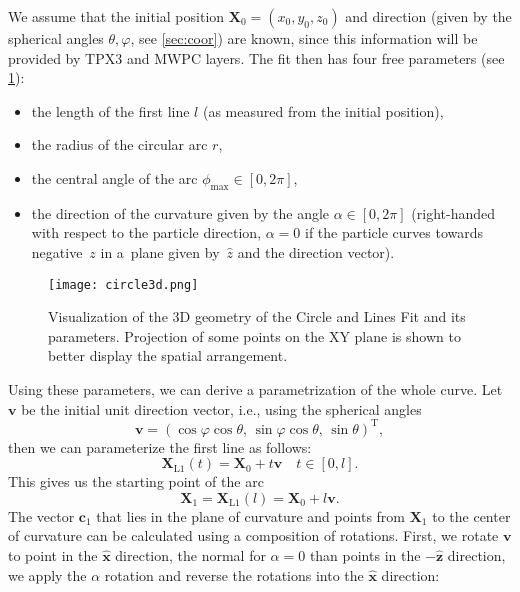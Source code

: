 			We assume that the initial position $\mathbf{X}_0 = (x_0,y_0,z_0)$ and direction (given by the spherical angles $\theta,\varphi$, see \cref{sec:coor}) are known, since this information will be provided by \ac{TPX3} and \ac{MWPC} layers. The fit then has four free parameters (see \cref{fig:circle3d}):
				\begin{itemize}[nosep]
					\item the length of the first line $l$ (as measured from the initial position),
					\item the radius of the circular arc $r$,
					\item the central angle of the arc $\phi_\text{max} \in [0,2\pi]$,
					\item the direction of the curvature given by the angle $\alpha \in [0,2\pi]$ (right-handed with respect to the particle direction, $\alpha = 0$ if the particle curves towards negative~$z$ in a~plane given by~$\hat{z}$ and the direction vector).
				\end{itemize}
			\begin{figure}
				\centering
				\texttt{[image: circle3d.png]}
				\caption{Visualization of the 3D geometry of the Circle and Lines Fit and its parameters. Projection of some points on the XY plane is shown to better display the spatial arrangement.}
				\label{fig:circle3d}
			\end{figure}
			Using these parameters, we can derive a parametrization of the whole curve. Let $\mathbf{v}$ be the initial unit direction vector, i.e., using the spherical angles
				\begin{equation}
					\mathbf{v} = (\cos\varphi\cos\theta, \,\sin\varphi\cos\theta, \,\sin\theta)^\mathrm{T},
				\end{equation}
			then we can parameterize the first line as follows:
				\begin{equation}
					\mathbf{X}_\text{L1}(t) = \mathbf{X}_0 + t\mathbf{v} \quad t\in[0,l].
				\end{equation}
			This gives us the starting point of the arc
				\begin{equation}
					\mathbf{X}_1 = \mathbf{X}_\text{L1}(l) = \mathbf{X}_0 + l\mathbf{v}.
				\end{equation}
			The vector $\mathbf{c}_1$ that lies in the plane of curvature and points from $\mathbf{X}_1$ to the center of curvature can be calculated using a composition of rotations. First, we rotate $\mathbf{v}$ to point in the $\mathbf{\hat{x}}$ direction, the normal for $\alpha = 0$ than points in the $-\mathbf{\hat{z}}$ direction, we apply the $\alpha$ rotation and reverse the rotations into the $\mathbf{\hat{x}}$ direction:
